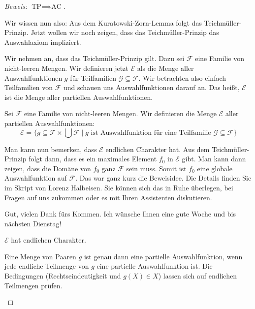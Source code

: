 \begin{proof}[Beweis: $\text{TP} \implies \text{AC}$]
\begin{spoken-clean}[01:05:00 - 01:07:30]
Wir wissen nun also: Aus dem Kuratowski-Zorn-Lemma folgt das Teichmüller-Prinzip. Jetzt wollen wir noch zeigen, dass das Teichmüller-Prinzip das Auswahlaxiom impliziert.

Wir nehmen an, dass das Teichmüller-Prinzip gilt. Dazu sei $\mathcal{F}$ eine Familie von nicht-leeren Mengen. Wir definieren jetzt $\mathcal{E}$ als die Menge aller Auswahlfunktionen $g$ für Teilfamilien $\mathcal{G} \subseteq \mathcal{F}$. Wir betrachten also einfach Teilfamilien von $\mathcal{F}$ und schauen uns Auswahlfunktionen darauf an. Das heißt, $\mathcal{E}$ ist die Menge aller partiellen Auswahlfunktionen.
\end{spoken-clean}

\begin{math-stroke}
Sei $\mathcal{F}$ eine Familie von nicht-leeren Mengen.
Wir definieren die Menge $\mathcal{E}$ aller partiellen Auswahlfunktionen:
\[
\mathcal{E} = \{ g \subseteq \mathcal{F} \times \bigcup \mathcal{F} \mid g \text{ ist Auswahlfunktion für eine Teilfamilie } \mathcal{G} \subseteq \mathcal{F} \}
\]
\end{math-stroke}

\begin{spoken-clean}[01:07:30 - 01:10:00]
Man kann nun bemerken, dass $\mathcal{E}$ endlichen Charakter hat. Aus dem Teichmüller-Prinzip folgt dann, dass es ein maximales Element $f_0$ in $\mathcal{E}$ gibt. Man kann dann zeigen, dass die Domäne von $f_0$ ganz $\mathcal{F}$ sein muss. Somit ist $f_0$ eine globale Auswahlfunktion auf $\mathcal{F}$. Das war ganz kurz die Beweisidee. Die Details finden Sie im Skript von Lorenz Halbeisen. Sie können sich das in Ruhe überlegen, bei Fragen auf uns zukommen oder es mit Ihren Assistenten diskutieren. 

Gut, vielen Dank fürs Kommen. Ich wünsche Ihnen eine gute Woche und bis nächsten Dienstag!
\end{spoken-clean}

\begin{math-stroke}
\begin{claim}
$\mathcal{E}$ hat endlichen Charakter.
\end{claim}
\begin{short-proof}
Eine Menge von Paaren $g$ ist genau dann eine partielle Auswahlfunktion, wenn jede endliche Teilmenge von $g$ eine partielle Auswahlfunktion ist. Die Bedingungen (Rechtseindeutigkeit und $g(X) \in X$) lassen sich auf endlichen Teilmengen prüfen.
\end{short-proof}


\end{math-stroke}
\end{proof}
